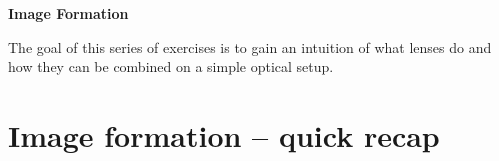 \documentclass[a4paper]{report}
\begin{document}
	\setcounter{secnumdepth}{2}

	\begin{center}
		\textbf{\Large{Image Formation}}
	\end{center}

	\vspace{0.8cm}
	\noindent The goal of this series of exercises is to gain an intuition of what lenses do and how they can be combined on a simple optical setup.




	\section{Image formation -- quick recap}
	\hypertarget{hintBack-recap}{}
\end{document}
